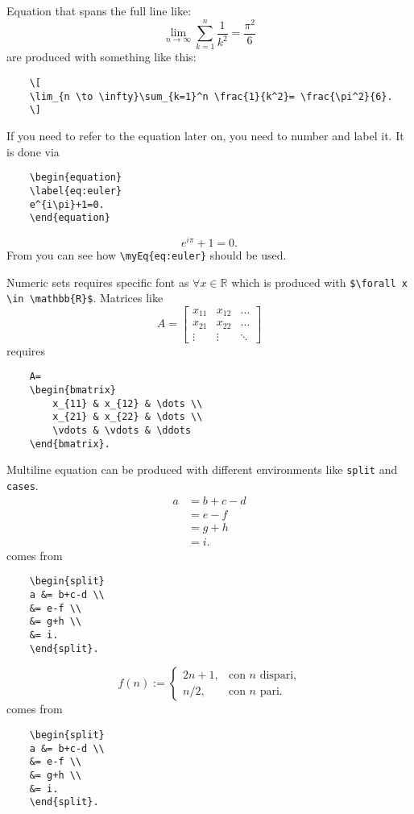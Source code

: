 Equation that spans the full line like:
\[
\lim_{n \to \infty}\sum_{k=1}^n \frac{1}{k^2}= \frac{\pi^2}{6}
\]
are produced with something like this:
\begin{verbatim}
	\[
	\lim_{n \to \infty}\sum_{k=1}^n \frac{1}{k^2}= \frac{\pi^2}{6}.
	\]
\end{verbatim}
If you need to refer to the equation later on, you need to number and label it. It is done via
\begin{verbatim}
	\begin{equation}
	\label{eq:euler}
	e^{i\pi}+1=0.
	\end{equation}
\end{verbatim}
\begin{equation}
	\label{eq:euler}
	e^{i\pi}+1=0.
\end{equation}
From  you can see how \verb!\myEq{eq:euler}! should be used.

Numeric sets requires specific font as $\forall x \in \mathbb{R}$ which is produced with \verb!$\forall x \in \mathbb{R}$!. Matrices like
\[
A=
\begin{bmatrix}
x_{11} & x_{12} & \dots \\
x_{21} & x_{22} & \dots \\
\vdots & \vdots & \ddots
\end{bmatrix}
\]
requires
\begin{verbatim}
	A=
	\begin{bmatrix}
		x_{11} & x_{12} & \dots \\
		x_{21} & x_{22} & \dots \\
		\vdots & \vdots & \ddots
	\end{bmatrix}.
\end{verbatim}
Multiline equation can be produced with different environments like \verb!split! and \verb!cases!.
\[ 
\begin{split} 
a &= b+c-d \\ 
  &= e-f \\ 
  &= g+h \\ 
  &= i. 
\end{split} 
\]
comes from
\begin{verbatim}
	\begin{split} 
	a &= b+c-d \\ 
 	&= e-f \\ 
	&= g+h \\ 
	&= i. 
	\end{split}. 
\end{verbatim}
\[
f(n):=
\begin{cases} 
2n+1, & \text{con $n$ dispari,} \\ 
n/2,  & \text{con $n$ pari.} 
\end{cases} 
\]
comes from
\begin{verbatim}
	\begin{split} 
	a &= b+c-d \\ 
 	&= e-f \\ 
	&= g+h \\ 
	&= i. 
	\end{split}. 
\end{verbatim}

